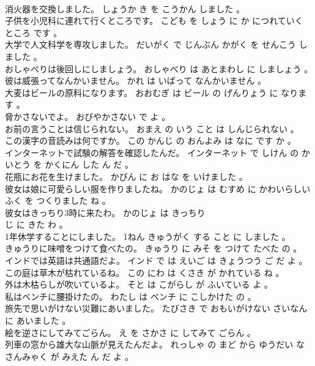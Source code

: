 \documentclass[8pt]{extreport}
\begin{document}
\begin{CJK}{UTF8}{min}
\\	消火器を交換しました。	しょうか き を こうかん しました 。 
\\	子供を小児科に連れて行くところです。	こども を しょう に か につれていく ところ です 。 
\\	大学で人文科学を専攻しました。	だいがく で じんぶん かがく を せんこう しました 。 
\\	おしゃべりは後回しにしましょう。	おしゃべり は あとまわし に しましょう 。 
\\	彼は威張ってなんかいません。	かれ は いばって なんかいません 。 
\\	大麦はビールの原料になります。	おおむぎ は ビール の げんりょう に なります 。 
\\	脅かさないでよ。	おびやかさない で よ 。 
\\	お前の言うことは信じられない。	おまえ の いう こと は しんじられない 。 
\\	この漢字の音読みは何ですか。	この かんじ の おんよみ は なに です か 。 
\\	インターネットで試験の解答を確認したんだ。	インターネット で しけん の かいとう を かくにん した ん だ 。 
\\	花瓶にお花を生けました。	かびん に お はな を いけました 。 
\\	彼女は娘に可愛らしい服を作りましたね。	かのじょ は むすめ に かわいらしい ふく を つくりました ね 。 
\\	彼女はきっちり3時に来たわ。	かのじょ は きっちり 
\\	じ に きた わ 。 
\\	1年休学することにしました。	1ねん きゅうがく する こと に しました 。 
\\	きゅうりに味噌をつけて食べたの。	きゅうり に みそ を つけて たべた の 。 
\\	インドでは英語は共通語だよ。	インド で は えいご は きょうつう ご だ よ 。 
\\	この庭は草木が枯れているね。	この にわ は くさき が かれている ね 。 
\\	外は木枯らしが吹いているよ。	そと は こがらし が ふいている よ 。 
\\	私はベンチに腰掛けたの。	わたし は ベンチ に こしかけた の 。 
\\	旅先で思いがけない災難にあいました。	たびさき で おもいがけない さいなん に あいました 。 
\\	絵を逆さにしてみてごらん。	え を さかさ に してみて ごらん 。 
\\	列車の窓から雄大な山脈が見えたんだよ。	れっしゃ の まど から ゆうだい な さんみゃく が みえた ん だ よ 。 

\end{CJK}
\end{document}
